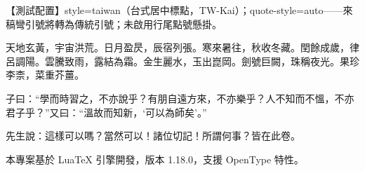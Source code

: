 \documentclass[12pt]{article}
\begin{document}
{\small 【測試配置】style=taiwan（台式居中標點，TW-Kai）；quote-style=auto——來稿彎引號將轉為傳統引號；未啟用行尾點號懸掛。}

天地玄黃，宇宙洪荒。日月盈昃，辰宿列張。寒來暑往，秋收冬藏。閏餘成歲，律呂調陽。雲騰致雨，露結為霜。金生麗水，玉出崑岡。劍號巨闕，珠稱夜光。果珍李柰，菜重芥薑。

子曰：“學而時習之，不亦說乎？有朋自遠方來，不亦樂乎？人不知而不慍，不亦君子乎？”又曰：“溫故而知新，‘可以為師矣’。”

先生說：這樣可以嗎？當然可以！諸位切記！所謂何事？皆在此卷。

本專案基於 LuaTeX 引擎開發，版本 1.18.0，支援 OpenType 特性。
\end{document}
